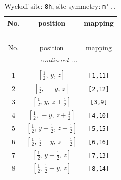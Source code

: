 \documentclass[fleqn,8pt]{jsarticle}
\begin{document}
\begin{longtable}{ccc}
\caption{Wyckoff site: {\tt 8h}, site symmetry: {\tt m'..}}
 \\
 \hline \hline
No. & position & mapping \\ \hline \endfirsthead

\multicolumn{2}{l}{\tablename\ \thetable{}} \\
 \hline \hline
No. & position & mapping \\ \hline \endhead

 \hline \hline
\multicolumn{2}{r}{\footnotesize\it continued ...} \\ \endfoot

 \hline \hline
\multicolumn{2}{r}{} \\ \endlastfoot

1 & $\left[ \frac{1}{2},\, y,\, z \right]$ & {\tt [1,11]} \\ \hline
2 & $\left[ \frac{1}{2},\, - y,\, z \right]$ & {\tt [2,12]} \\ \hline
3 & $\left[ \frac{1}{2},\, y,\, z + \frac{1}{2} \right]$ & {\tt [3,9]} \\ \hline
4 & $\left[ \frac{1}{2},\, - y,\, z + \frac{1}{2} \right]$ & {\tt [4,10]} \\ \hline
5 & $\left[ \frac{1}{2},\, y + \frac{1}{2},\, z + \frac{1}{2} \right]$ & {\tt [5,15]} \\ \hline
6 & $\left[ \frac{1}{2},\, \frac{1}{2} - y,\, z + \frac{1}{2} \right]$ & {\tt [6,16]} \\ \hline
7 & $\left[ \frac{1}{2},\, y + \frac{1}{2},\, z \right]$ & {\tt [7,13]} \\ \hline
8 & $\left[ \frac{1}{2},\, \frac{1}{2} - y,\, z \right]$ & {\tt [8,14]} \\
\end{longtable}
\renewcommand{\arraystretch}{1.2}
\end{document}
